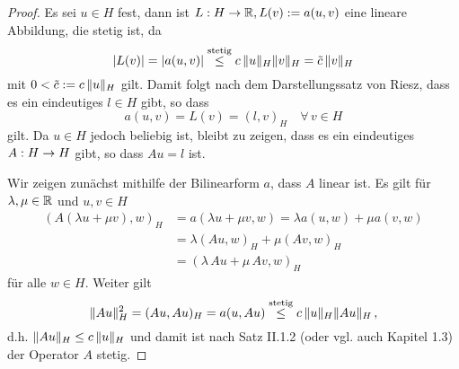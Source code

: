 \begin{proof}
Es sei $u\in H$ fest, dann ist $L: H\rightarrow \mathbb{R}, L(v) := a(u,v)$ eine lineare Abbildung, die stetig ist, da
\[
	\lvert L(v)\rvert = \lvert a(u,v)\rvert \stackrel{\scriptsize\text{stetig}}\le c \,  \lVert u\rVert_H \lVert v\rVert_H  = \tilde c\, \lVert v\rVert_H
\]
mit $0<\tilde c := c \, \lVert u\rVert_H$ gilt. Damit folgt nach dem Darstellungssatz von Riesz, dass es ein eindeutiges $l \in H$ gibt, so dass
\[
	a(u,v) = L(v) = (l,v)_H \quad \forall \, v \in H
\]
gilt. Da $u \in H$ jedoch beliebig ist, bleibt zu zeigen, dass es ein eindeutiges $A:H\rightarrow H$ gibt, so dass $Au = l$ ist.

Wir zeigen zunächst mithilfe der Bilinearform $a$, dass $A$ linear ist. Es gilt für $\lambda,\mu \in \mathbb{R}$ und $u,v \in H$
\begin{align*}
	(A(\lambda u + \mu v),w)_H &= a(\lambda u + \mu v, w) = \lambda a(u,w) + \mu a(v,w) \\
	& = \lambda (Au,w)_H + \mu(Av,w)_H \\
	& = (\lambda \, Au+\mu \, Av,w)_H
\end{align*}
für alle $w \in H$. Weiter gilt
\[
	\lVert Au\rVert_H^2 = (Au,Au)_H = a(u,Au) \stackrel{\scriptsize \text{stetig}}\le c \, \lVert u\rVert_H \lVert Au\rVert_H \, ,
\]
d.h. $\lVert Au\rVert_H \le c \, \lVert u\rVert_H$ und damit ist nach \cite{Werner} Satz II.1.2 (oder vgl. auch \cite{Ana2} Kapitel 1.3) der Operator $A$ stetig.


\end{proof}
